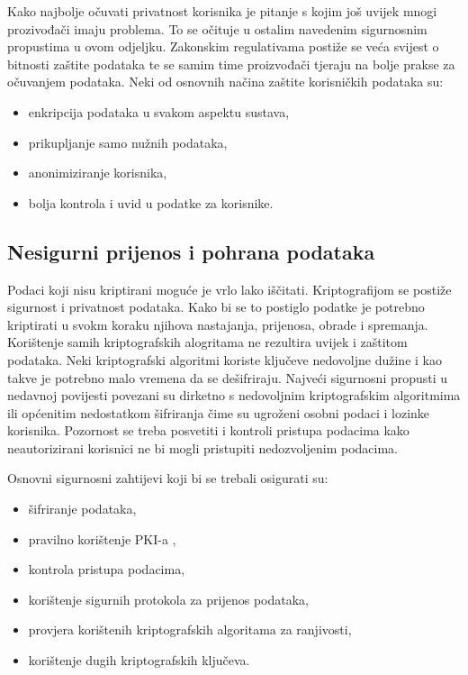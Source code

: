 \documentclass[times, utf8, diplomski]{fer}
\begin{document}
Kako najbolje očuvati privatnost korisnika je pitanje s kojim još uvijek mnogi prozivođači imaju problema. To se očituje u ostalim navedenim sigurnosnim propustima u ovom odjeljku. Zakonskim regulativama postiže se veća svijest o bitnosti zaštite podataka te se samim time proizvođači tjeraju na bolje prakse za očuvanjem podataka. Neki od osnovnih načina zaštite korisničkih podataka su: 
\begin{itemize}
    \item enkripcija podataka u svakom aspektu sustava,
    \item prikupljanje samo nužnih podataka,
    \item anonimiziranje korisnika,
    \item bolja kontrola i uvid u podatke za korisnike.
\end{itemize}

\subsection{Nesigurni prijenos i pohrana podataka}
Podaci koji nisu kriptirani moguće je vrlo lako iščitati. Kriptografijom se postiže sigurnost i privatnost podataka. Kako bi se to postiglo podatke je potrebno kriptirati u svokm koraku njihova nastajanja, prijenosa, obrade i spremanja. Korištenje samih kriptografskih alogritama ne rezultira uvijek i zaštitom podataka. Neki kriptografski algoritmi koriste ključeve nedovoljne dužine i kao takve je potrebno malo vremena da se dešifriraju. Najveći sigurnosni propusti u nedavnoj povijesti povezani su dirketno s nedovoljnim kriptografskim algoritmima ili općenitim nedostatkom šifriranja čime su ugroženi osobni podaci i lozinke korisnika.\citep{DataBreaches} Pozornost se treba posvetiti i kontroli pristupa podacima kako neautorizirani korisnici ne bi mogli pristupiti nedozvoljenim podacima. 

Osnovni sigurnosni zahtijevi koji bi se trebali osigurati su: \begin{itemize}
    \item šifriranje podataka,
    \item pravilno korištenje PKI-a ,
    \item kontrola pristupa podacima,
    \item korištenje sigurnih protokola za prijenos podataka,
    \item provjera korištenih kriptografskih algoritama za ranjivosti,
    \item korištenje dugih kriptografskih ključeva.
\end{itemize}     
\end{document}
